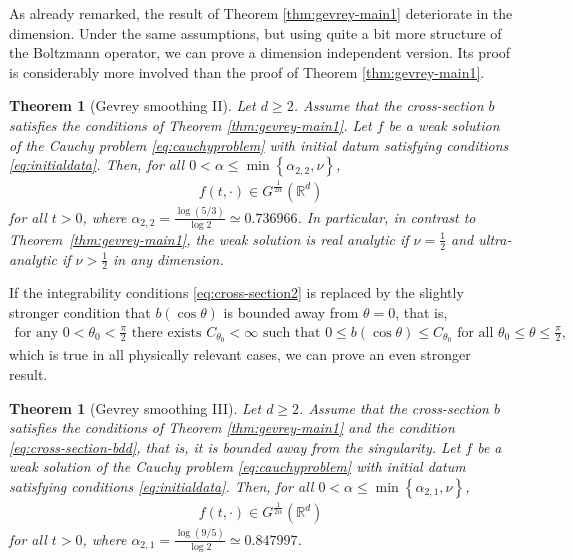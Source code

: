 \documentclass[11pt,a4paper,reqno]{amsart}
\theoremstyle{plain}
\newtheorem{theorem}[proposition]{Theorem}
\theoremstyle{definition}
\begin{document}
As already remarked, the result of Theorem \ref{thm:gevrey-main1} deteriorate in the dimension. Under the same assumptions, but using quite a bit more structure of the Boltzmann operator, we can prove a dimension independent version. Its proof is considerably more involved than the proof of Theorem \ref{thm:gevrey-main1}.

\begin{theorem}[Gevrey smoothing II]\label{thm:gevrey-main2}
	Let $d\ge 2$. Assume that the cross-section $b$ satisfies the conditions of Theorem \ref{thm:gevrey-main1}. Let $f$ be a weak solution of the Cauchy problem \eqref{eq:cauchyproblem} with initial datum satisfying conditions \eqref{eq:initialdata}. Then, for all $0<\alpha\leq \min\left\{\alpha_{2,2}, \nu\right\}$,
	\begin{align}
		f(t,\cdot)\in G^{\tfrac{1}{2\alpha}}({\mathbb{R}}^d)
	\end{align}
	for all $t>0$, where $\alpha_{2,2} = \frac{\log(5/3)}{\log 2} \simeq 0.736966$. In particular, in contrast to Theorem~\ref{thm:gevrey-main1}, the weak solution is real analytic if $\nu=\frac{1}{2}$ and ultra-analytic if $\nu>\frac{1}{2}$ in \emph{any dimension}.
\end{theorem}

If the integrability conditions \eqref{eq:cross-section2} is replaced by the slightly stronger condition that $b(\cos\theta)$ is bounded away from $\theta=0$, that is,
\begin{align}\label{eq:cross-section-bdd}
	\text{for any } 0<\theta_0<\tfrac{\pi}{2} \text{ there exists } C_{\theta_0}<\infty
	\text{ such that } 0\le b(\cos\theta) \le C_{\theta_0}   \text{ for all } \theta_0\le \theta\le \tfrac{\pi}{2},
\end{align}
which is true in all physically relevant cases,
we can prove an even stronger result.

\begin{theorem}[Gevrey smoothing III]\label{thm:gevrey-main3}
	Let $d\ge 2$. Assume that the cross-section $b$ satisfies the conditions of Theorem \ref{thm:gevrey-main1} and the condition \eqref{eq:cross-section-bdd},  that is, it is bounded away from the singularity.  Let $f$ be a weak solution of the Cauchy problem \eqref{eq:cauchyproblem} with initial datum satisfying conditions \eqref{eq:initialdata}. Then, for all $0<\alpha\leq \min\left\{\alpha_{2,1}, \nu\right\}$,
	\begin{align}
		f(t,\cdot)\in G^{\tfrac{1}{2\alpha}}({\mathbb{R}}^d)
	\end{align}
	for all $t>0$, where $\alpha_{2,1} = \frac{\log(9/5)}{\log 2} \simeq 0.847997$.
\end{theorem}
\end{document}
